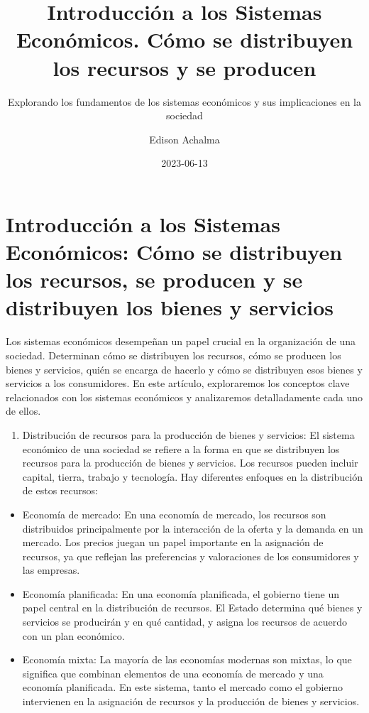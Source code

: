 \documentclass[
  letterpaper,
  DIV=11,
  numbers=noendperiod]{scrartcl}
\title{Introducción a los Sistemas Económicos. Cómo se distribuyen los
recursos y se producen}
\subtitle{Explorando los fundamentos de los sistemas económicos y sus
implicaciones en la sociedad}
\author{Edison Achalma}
\date{2023-06-13}
\providecommand{\tightlist}{%
  \setlength{\itemsep}{0pt}\setlength{\parskip}{0pt}}\usepackage{longtable,booktabs,array}
\begin{document}
\maketitle
\ifdefined\Shaded\renewenvironment{Shaded}{\begin{tcolorbox}[borderline west={3pt}{0pt}{shadecolor}, sharp corners, enhanced, boxrule=0pt, frame hidden, interior hidden, breakable]}{\end{tcolorbox}}\fi

\hypertarget{introducciuxf3n-a-los-sistemas-econuxf3micos-cuxf3mo-se-distribuyen-los-recursos-se-producen-y-se-distribuyen-los-bienes-y-servicios}{%
\section{Introducción a los Sistemas Económicos: Cómo se distribuyen los
recursos, se producen y se distribuyen los bienes y
servicios}\label{introducciuxf3n-a-los-sistemas-econuxf3micos-cuxf3mo-se-distribuyen-los-recursos-se-producen-y-se-distribuyen-los-bienes-y-servicios}}

Los sistemas económicos desempeñan un papel crucial en la organización
de una sociedad. Determinan cómo se distribuyen los recursos, cómo se
producen los bienes y servicios, quién se encarga de hacerlo y cómo se
distribuyen esos bienes y servicios a los consumidores. En este
artículo, exploraremos los conceptos clave relacionados con los sistemas
económicos y analizaremos detalladamente cada uno de ellos.

\begin{enumerate}
\def\labelenumi{\arabic{enumi}.}
\tightlist
\item
  Distribución de recursos para la producción de bienes y servicios: El
  sistema económico de una sociedad se refiere a la forma en que se
  distribuyen los recursos para la producción de bienes y servicios. Los
  recursos pueden incluir capital, tierra, trabajo y tecnología. Hay
  diferentes enfoques en la distribución de estos recursos:
\end{enumerate}

\begin{itemize}
\item
  Economía de mercado: En una economía de mercado, los recursos son
  distribuidos principalmente por la interacción de la oferta y la
  demanda en un mercado. Los precios juegan un papel importante en la
  asignación de recursos, ya que reflejan las preferencias y
  valoraciones de los consumidores y las empresas.
\item
  Economía planificada: En una economía planificada, el gobierno tiene
  un papel central en la distribución de recursos. El Estado determina
  qué bienes y servicios se producirán y en qué cantidad, y asigna los
  recursos de acuerdo con un plan económico.
\item
  Economía mixta: La mayoría de las economías modernas son mixtas, lo
  que significa que combinan elementos de una economía de mercado y una
  economía planificada. En este sistema, tanto el mercado como el
  gobierno intervienen en la asignación de recursos y la producción de
  bienes y servicios.
\end{itemize}
\end{document}
